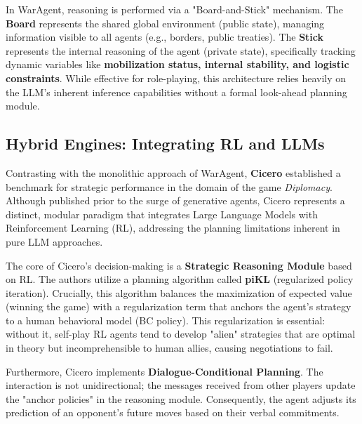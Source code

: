 In WarAgent, reasoning is performed via a "Board-and-Stick" mechanism. The \textbf{Board} represents the shared global environment (public state), managing information visible to all agents (e.g., borders, public treaties). The \textbf{Stick} represents the internal reasoning of the agent (private state), specifically tracking dynamic variables like \textbf{mobilization status, internal stability, and logistic constraints}. While effective for role-playing, this architecture relies heavily on the LLM's inherent inference capabilities without a formal look-ahead planning module.

\subsection{Hybrid Engines: Integrating RL and LLMs}
Contrasting with the monolithic approach of WarAgent, \textbf{Cicero} \cite{meta2022human} established a benchmark for strategic performance in the domain of the game \textit{Diplomacy}. Although published prior to the surge of generative agents, Cicero represents a distinct, modular paradigm that integrates Large Language Models with Reinforcement Learning (RL), addressing the planning limitations inherent in pure LLM approaches.

The core of Cicero's decision-making is a \textbf{Strategic Reasoning Module} based on RL. The authors utilize a planning algorithm called \textbf{piKL} (regularized policy iteration). Crucially, this algorithm balances the maximization of expected value (winning the game) with a regularization term that anchors the agent's strategy to a human behavioral model (BC policy). This regularization is essential: without it, self-play RL agents tend to develop "alien" strategies that are optimal in theory but incomprehensible to human allies, causing negotiations to fail.

Furthermore, Cicero implements \textbf{Dialogue-Conditional Planning}. The interaction is not unidirectional; the messages received from other players update the "anchor policies" in the reasoning module. Consequently, the agent adjusts its prediction of an opponent's future moves based on their verbal commitments.

